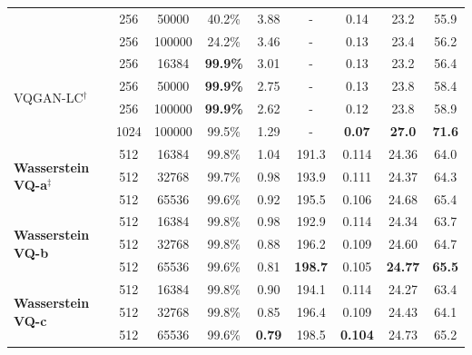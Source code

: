 \begin{table}[!t]
{\begin{tabular}{lcccccccc}
& 256 & 50000 &  40.2\% & 3.88 & -  & 0.14 & 23.2 & 55.9 \\
& 256 & 100000 & 24.2\% & 3.46 & -  &  0.13 & 23.4 & 56.2 \\
\midrule
\multirow{4}{*}{VQGAN-LC$^{\dagger}$} & 256 & 16384 & \textbf{99.9\%}  & 3.01 & - & 0.13 & 23.2 & 56.4 \\
 & 256 & 50000 & \textbf{99.9\%}  & 2.75 & - & 0.13 &  23.8 &  58.4 \\
 & 256 & 100000 & \textbf{99.9\%}  & 2.62 & - &  0.12 &  23.8 & 58.9 \\
 & 1024 & 100000 & 99.5\%  & 1.29 & - &  \textbf{0.07} &  \textbf{27.0} &  \textbf{71.6} \\\midrule
\midrule
\multirow{3}{*}{\textbf{Wasserstein VQ-a}$^{\ddagger}$} & 512 & 16384 & 99.8\% & 1.04 & 191.3 & 0.114 & 24.36 & 64.0 \\
& 512 & 32768 &  99.7\% & 0.98 &  193.9 & 0.111 & 24.37 & 64.3 \\
& 512 & 65536 & 99.6\% & 0.92 & 195.5 & 0.106 & 24.68 & 65.4 \\\midrule
\multirow{3}{*}{\textbf{Wasserstein VQ-b}} & 512 & 16384 & 99.8\% & 0.98 & 192.9 & 0.114 & 24.34 & 63.7\\
& 512 & 32768 & 99.8\% & 0.88 & 196.2 & 0.109 & 24.60 & 64.7 \\
& 512 & 65536 & 99.6\% & 0.81 & \textbf{198.7} & 0.105 & \textbf{24.77} & \textbf{65.5}\\\midrule
\multirow{3}{*}{\textbf{Wasserstein VQ-c}} & 512 & 16384 & 99.8\% & 0.90 & 194.1 & 0.114 & 24.27 & 63.4\\
& 512 & 32768 & 99.8\% & 0.85 & 196.4 & 0.109 & 24.43 & 64.1 \\
& 512 & 65536 & 99.6\% & \textbf{0.79} & 198.5 & \textbf{0.104} & 24.73 & 65.2 \\
\bottomrule
\end{tabular}}
\vspace{-2ex}
\label{tab:reconstruction_IN-main table}
\end{table}

